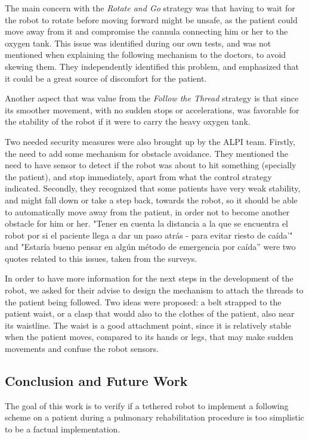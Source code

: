 \documentclass[journal]{IEEEtran}
\begin{document}
The main concern with the \textit{Rotate and Go} strategy was that having to wait for the robot to rotate before moving forward might be unsafe, as the patient could move away from it and compromise the cannula connecting him or her to the oxygen tank. This issue was identified during our own tests, and was not mentioned when explaining the following mechanism to the doctors, to avoid skewing them. They independently identified this problem, and emphasized that it could be a great source of discomfort for the patient.

Another aspect that was value from the \textit{Follow the Thread} strategy is that since its smoother movement, with no sudden stops or accelerations, was favorable for the stability of the robot if it were to carry the heavy oxygen tank.

Two needed security measures were also brought up by the ALPI team. Firstly, the need to add some mechanism for obstacle avoidance. They mentioned the need to have sensor to detect if the robot was about to hit something (specially the patient), and stop immediately, apart from what the control strategy indicated. Secondly, they recognized that some patients have very weak stability, and might fall down or take a step back, towards the robot, so it should be able to automatically move away from the patient, in order not to become another obstacle for him or her. "Tener en cuenta la distancia a la que se encuentra el robot por si el paciente llega a dar un paso atrás - para evitar riesto de caída'" and "Estaría bueno pensar en algún método de emergencia por caída'' were two quotes related to this issues, taken from the surveys. 

In order to have more information for the next steps in the development of the robot, we asked for their advise to design the mechanism to attach the threads to the patient being followed. Two ideas were proposed: a belt strapped to the patient waist, or a clasp that would also to the clothes of the patient, also near its waistline. The waist is a good attachment point, since it is relatively stable when the patient moves, compared to its hands or legs, that may make sudden movements and confuse the robot sensors. 


\subsection{Conclusion and Future Work}
\label{conclusion}

The goal of this work is to verify if a tethered robot to implement a following scheme on a patient during a pulmonary rehabilitation procedure is too simplistic to be a factual implementation.
\end{document}
